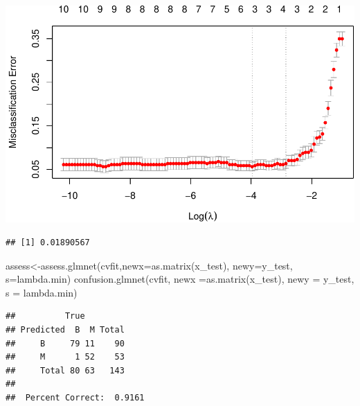 \documentclass[
  11pt,
]{article}
\newenvironment{Shaded}{\begin{snugshade}}{\end{snugshade}}
\newcommand{\AttributeTok}[1]{\textcolor[rgb]{0.77,0.63,0.00}{#1}}
\newcommand{\DecValTok}[1]{\textcolor[rgb]{0.00,0.00,0.81}{#1}}
\newcommand{\FunctionTok}[1]{\textcolor[rgb]{0.00,0.00,0.00}{#1}}
\newcommand{\NormalTok}[1]{#1}
\newcommand{\OtherTok}[1]{\textcolor[rgb]{0.56,0.35,0.01}{#1}}
\newcommand{\SpecialCharTok}[1]{\textcolor[rgb]{0.00,0.00,0.00}{#1}}
\newcommand{\StringTok}[1]{\textcolor[rgb]{0.31,0.60,0.02}{#1}}
\begin{document}
\includegraphics{stat_DAP_files/figure-latex/unnamed-chunk-16-1.pdf}

\begin{Shaded}
\end{Shaded}

\begin{verbatim}
## [1] 0.01890567
\end{verbatim}

\begin{Shaded}
\begin{Highlighting}[]
\NormalTok{assess}\OtherTok{\textless{}{-}}\FunctionTok{assess.glmnet}\NormalTok{(cvfit,}\AttributeTok{newx=}\FunctionTok{as.matrix}\NormalTok{(x\_test), }\AttributeTok{newy=}\NormalTok{y\_test, }\AttributeTok{s=}\StringTok{\textquotesingle{}lambda.min\textquotesingle{}}\NormalTok{)}
\FunctionTok{confusion.glmnet}\NormalTok{(cvfit, }\AttributeTok{newx =}\FunctionTok{as.matrix}\NormalTok{(x\_test), }\AttributeTok{newy =}\NormalTok{ y\_test, }\AttributeTok{s =} \StringTok{\textquotesingle{}lambda.min\textquotesingle{}}\NormalTok{)}
\end{Highlighting}
\end{Shaded}

\begin{verbatim}
##          True
## Predicted  B  M Total
##     B     79 11    90
##     M      1 52    53
##     Total 80 63   143
## 
##  Percent Correct:  0.9161
\end{verbatim}

\begin{Shaded}
\end{Shaded}
\end{document}
